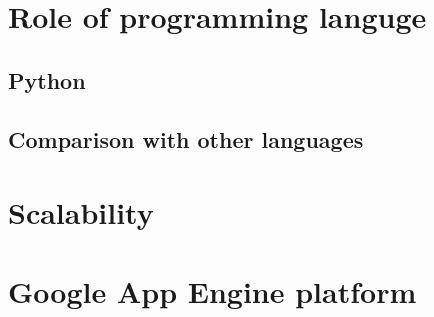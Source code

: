 \section{Role of programming languge}\label{sec:language}
\subsection{Python}\label{subsec:py}
\subsection{Comparison with other languages}\label{subsec:lang_compare}
\section{Scalability}\label{sec:scalability}
\section{Google App Engine platform}\label{sec:gae_general}